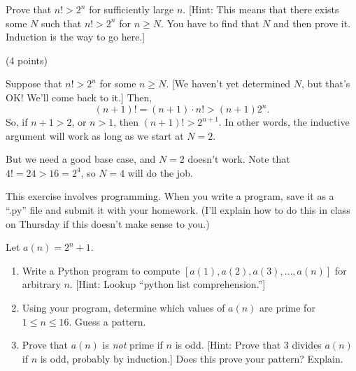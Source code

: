 \documentclass[12pt]{rudin}
\begin{document}
\begin{Exercise}
    Prove that $n! > 2^n$ for sufficiently large $n$. [Hint: This means that
    there exists some $N$ such that $n! > 2^n$ for $n \geq N$. You have to find
    that $N$ and then prove it. Induction is the way to go here.]
\end{Exercise}

\begin{Answer}
	(4 points)

	Suppose that $n! > 2^n$ for some $n \geq N$. [We haven't yet determined
	$N$, but that's OK! We'll come back to it.] Then, $$(n + 1)! = (n + 1)
	\cdot n! > (n + 1) 2^n.$$ So, if $n + 1 > 2$, or $n > 1$, then $(n +
	1)! > 2^{n + 1}$. In other words, the inductive argument will work as
	long as we start at $N = 2$.

	But we need a good base case, and $N = 2$ doesn't work. Note that $4!
	= 24 > 16 = 2^4$, so $N = 4$ will do the job.
\end{Answer}

\begin{Exercise}
    This exercise involves programming. When you write a program, save it as a
    ``.py'' file and submit it with your homework. (I'll explain how to do this
    in class on Thursday if this doesn't make sense to you.)

    Let $a(n) = 2^n + 1$.

    \begin{enumerate}[label=(\textbf{\alph*})]
        \item Write a Python program to compute $[a(1), a(2), a(3), \dots,
            a(n)]$ for arbitrary $n$. [Hint: Lookup ``python list
            comprehension.'']

        \item Using your program, determine which values of $a(n)$ are prime
            for $1 \leq n \leq 16$. Guess a pattern.

        \item Prove that $a(n)$ is \emph{not} prime if $n$ is odd. [Hint: Prove
            that $3$ divides $a(n)$ if $n$ is odd, probably by induction.] Does
            this prove your pattern? Explain.
    \end{enumerate}
\end{Exercise}
\end{document}
